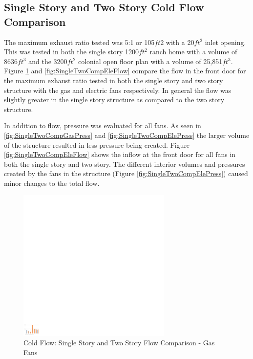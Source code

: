 \documentclass{article}
\begin{document}
\subsection{Single Story and Two Story Cold Flow Comparison}

The maximum exhaust ratio tested was 5:1 or 105$ft2$ with a 20$ft^2$ inlet opening. This was tested in both the single story 1200$ft^2$ ranch home with a volume of 8636$ft^3$ and the 3200$ft^2$ colonial open floor plan with a volume of 25,851$ft^3$. Figure \ref{fig:SingleTwoCompGasFlow} and \ref{fig:SingleTwoCompEleFlow} compare the flow in the front door for the maximum exhaust ratio tested in both the single story and two story structure with the gas and electric fans respectively. In general the flow was slightly greater in the single story structure as compared to the two story structure. 

In addition to flow, pressure was evaluated for all fans. As seen in \ref{fig:SingleTwoCompGasPress} and \ref{fig:SingleTwoCompElePress} the larger volume of the structure resulted in less pressure being created. Figure \ref{fig:SingleTwoCompEleFlow} shows the inflow at the front door for all fans in both the single story and two story. The different interior volumes and pressures created by the fans in the structure (Figure \ref{fig:SingleTwoCompElePress}) caused minor changes to the total flow. 

\begin{figure}[H]
	\centering
	\includegraphics[width=3in]{0_Images/ColdFlow/Gas_Flow.pdf}
	\caption{Cold Flow: Single Story and Two Story Flow Comparison - Gas Fans}
	\label{fig:SingleTwoCompGasFlow}
\end{figure}
\end{document}
